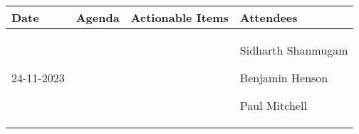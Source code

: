 \begin{table}[!h]
    \centering
    \begin{tabularx}{\textwidth}{|l|X|X|X|}
        \hline
        Date & Agenda & Actionable Items & Attendees \\
        \hline
        \hline
        24-11-2023 & 
        \begin{myitemize}
            \item 
        \end{myitemize} & 
        \begin{myitemize}
            \item 
        \end{myitemize} & 
        \begin{myitemize}
            \item Sidharth Shanmugam
            \item Benjamin Henson
            \item Paul Mitchell
        \end{myitemize} \\
        \hline
    \end{tabularx}
\end{table}
